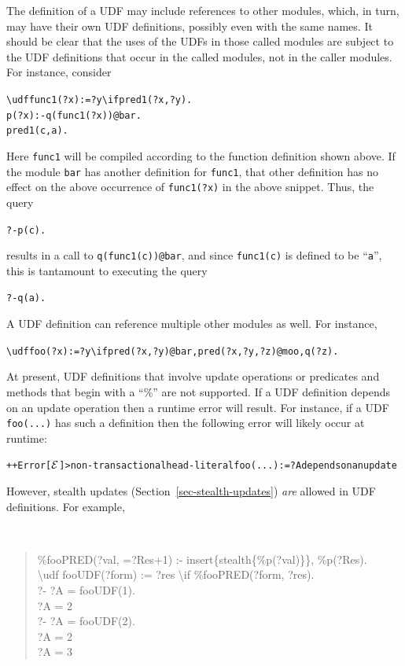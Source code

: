 \documentclass[11pt]{article}
\newcommand{\ERGO}{\mbox{\ensuremath{\cal{E}}\smaller{{\sc{RGO}}}}\xspace}
\newcommand{\FLSYSTEM}{\ERGO}
\newcommand{\bs}{\textbackslash}
\begin{document}
The definition of a UDF may include references to other modules, which, in
turn, may have their own UDF definitions, possibly even with the same names.
It should be clear that the uses of the UDFs in those called modules are subject to the UDF
definitions that occur in the called modules, not in the caller modules.
For instance, consider
\begin{alltt}
    \bs{}udf func1(?x) := ?y \bs{}if pred1(?x,?y).
    p(?x) :- q(func1(?x))@bar.
    pred1(c,a).
\end{alltt}
Here \texttt{func1} will be compiled according to the function definition
shown above. If the module \texttt{bar} has another definition for
\texttt{func1}, that  other definition has no effect on the above occurrence of
\texttt{func1(?x)} in the above snippet.   Thus, the query
\begin{alltt}
?- p(c).
\end{alltt}
results in a call to \texttt{q(func1(c))@bar}, and since \texttt{func1(c)} is
defined to be ``\texttt{a}'', this is tantamount to executing the query  
\begin{alltt}
?- q(a).
\end{alltt}
A UDF definition can reference multiple other modules as well. For instance,
\begin{alltt}
    \bs{}udf foo(?x):=?y \bs{}if pred(?x,?y)@bar, pred(?x,?y,?z)@moo, q(?z).
\end{alltt}
At present, UDF definitions that involve update operations or predicates and methods
that begin with a ``\%'' are not  supported. If a UDF definition
depends on an update operation then a runtime error will result. For instance, if a UDF
\texttt{foo(...)} has such a definition then the following error will
likely occur at runtime: 
\begin{alltt}
++Error[\FLSYSTEM{}]> non-transactional head-literal foo(...) := ?A depends on an update
\end{alltt}
However,
stealth updates (Section~\ref{sec-stealth-updates})
\emph{are} allowed in UDF definitions. For example,
{\tt
\begin{quote}
    \%fooPRED(?val, =?Res+1) :- insert\{stealth\{\%p(?val)\}\}, \%p(?Res).
    \\
    \bs{}udf fooUDF(?form) := ?res \bs{}if \%fooPRED(?form, ?res).
    \vspace{2mm}\\
    ?- ?A = fooUDF(1).
    \vspace*{3mm}\\
    ?A = 2
    \vspace{2mm}\\
    ?- ?A = fooUDF(2).
    \vspace*{3mm}\\
    ?A = 2
    \\
    ?A = 3
\end{quote}
  }
\end{document}
